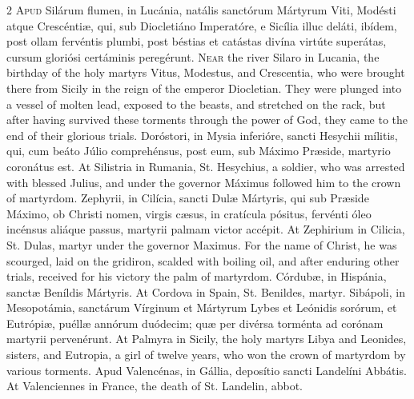 \begin{paracol}{2}
\lettrine[lines=2]{A}{pud} Silárum flumen, in 
 Lucánia, natális sanctórum Mártyrum Viti, Modésti atque Crescéntiæ, qui, sub 
 Diocletiáno Imperatóre, e Sicília illuc deláti, ibídem, post ollam fervéntis 
 plumbi, post béstias et catástas divína virtúte superátas, cursum gloriósi 
 certáminis peregérunt.
\switchcolumn
{}
\lettrine[lines=2]{N}{ear} the river Silaro in Lucania, 
 the birthday of the holy martyrs Vitus, Modestus, and Crescentia, who were 
 brought there from Sicily in the reign of the emperor Diocletian. They 
 were plunged into a vessel of molten lead, exposed to the beasts, and 
 stretched on the rack, but after having survived these torments through the 
 power of God, they came to the end of their glorious trials.
\switchcolumn*
{}
Doróstori, in Mysia 
 inferióre, sancti Hesychii mílitis, qui, cum beáto Júlio comprehénsus, post 
 eum, sub Máximo Præside, martyrio coronátus est.
\switchcolumn
{}
At Silistria in Rumania, St. 
 Hesychius, a soldier, who was arrested with blessed Julius, and under the 
 governor Máximus followed him to the crown of martyrdom.
\switchcolumn*
{}
Zephyrii, in Cilícia, 
 sancti Dulæ Mártyris, qui sub Præside Máximo, ob Christi nomen, virgis cæsus, 
 in cratícula pósitus, fervénti óleo incénsus aliáque passus, martyrii palmam 
 victor accépit.
\switchcolumn
{}
At Zephirium in Cilicia, St. Dulas, 
 martyr under the governor Maximus. For the name of Christ, he was 
 scourged, laid on the gridiron, scalded with boiling oil, and after enduring 
 other trials, received for his victory the palm of martyrdom.
\switchcolumn*
{}
Córdubæ, in Hispánia, 
 sanctæ Beníldis Mártyris.
\switchcolumn
{}
At Cordova in Spain, St. Benildes, 
 martyr.
\switchcolumn*
{}
Sibápoli, in 
 Mesopotámia, sanctárum Vírginum et Mártyrum Lybes et Leónidis sorórum, et 
 Eutrópiæ, puéllæ annórum duódecim; quæ per divérsa torménta ad corónam 
 martyrii pervenérunt.
\switchcolumn
{}
At Palmyra in Sicily, the holy 
 martyrs Libya and Leonides, sisters, and Eutropia, a girl of twelve years, 
 who won the crown of martyrdom by various torments.
\switchcolumn*
{}
Apud Valencénas, in 
 Gállia, deposítio sancti Landelíni Abbátis.
\switchcolumn
{}
At Valenciennes in France, the 
 death of St. Landelin, abbot.
\switchcolumn*
{}

\end{paracol}
